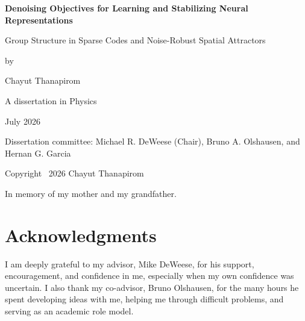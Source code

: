 \documentclass[11pt,oneside,openany]{book}
\begin{document}
\hypersetup{pageanchor=false}

\begin{titlepage}
\centering
\vspace*{0.9in}
{\sffamily\bfseries\LARGE Denoising Objectives for Learning and Stabilizing Neural Representations\par}
\vspace{0.35in}
{\Large Group Structure in Sparse Codes and Noise-Robust Spatial Attractors\par}
\vspace{0.8in}
{\large by\par}
\vspace{0.12in}
{\Large Chayut Thanapirom\par}
\vfill
{\large A dissertation in Physics\par}
\vspace{0.35in}
{\large July 2026\par}
\vspace{0.5in}
{\small Dissertation committee: Michael R. DeWeese (Chair), Bruno A. Olshausen, and Hernan G. Garcia\par}
\end{titlepage}

\frontmatter
\hypersetup{pageanchor=true}

\thispagestyle{empty}
\vspace*{\fill}
\begin{center}
Copyright \textcopyright\ 2026 Chayut Thanapirom
\end{center}
\vspace*{\fill}
\clearpage


\clearpage

\thispagestyle{empty}
\vspace*{\fill}
\begin{center}
In memory of my mother and my grandfather.
\end{center}
\vspace*{\fill}
\clearpage

\tableofcontents
\listoffigures
\listoftables

\chapter*{Acknowledgments}
I am deeply grateful to my advisor, Mike DeWeese, for his support, encouragement, and confidence in me, especially when my own confidence was uncertain. I also thank my co-advisor, Bruno Olshausen, for the many hours he spent developing ideas with me, helping me through difficult problems, and serving as an academic role model.
\end{document}
